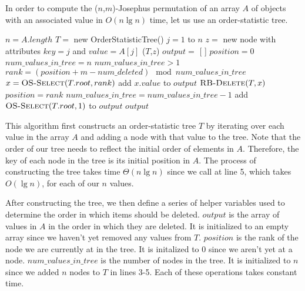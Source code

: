\documentclass[11pt]{article}
\begin{document}
In order to compute the ($n$,$m$)-Josephus permutation of an array $A$ of objects with an associated value in $O(n\lg{n})$ time, let us use an order-statistic tree.

\begin{codebox}
\li $n = A.length$
\li $T = $ new OrderStatisticTree()
\li \For $j=1$ to $n$ \Do
\li     $z = $ new node with attributes $key = j$ and $value = A[j]$
\li     {}($T$,$z$)
\li \End
\li $output =$ [ ]
\li $position = 0$
\li $num\_values\_in\_tree = n$
\li
\li \While $num\_values\_in\_tree > 1$ \Do
\li     $rank = (position + m - num\_deleted) \mod num\_values\_in\_tree$
\li     $x = \textnormal{\scshape OS-Select}(T.root, rank)$
\li     add $x.value$ to $output$
\li     $\textnormal{\scshape RB-Delete}(T,x)$
\li     $position = rank$
\li     $num\_values\_in\_tree = num\_values\_in\_tree - 1$
\li \End
\li add $\textnormal{\scshape OS-Select}(T.root, 1)$ to $output$
\li \Return $output$
\end{codebox}

This algorithm first constructs an order-statistic tree $T$ by iterating over each value in the array $A$ and adding a node with that value to the tree. Note that the order of our tree needs to reflect the initial order of elements in $A$. Therefore, the key of each node in the tree is its initial position in $A$. The process of constructing the tree takes time $\Theta(n\lg{n})$ since we call  at line 5, which takes $O(\lg{n})$, for each of our $n$ values.

After constructing the tree, we then define a series of helper variables used to determine the order in which items should be deleted. $output$ is the array of values in $A$ in the order in which they are deleted. It is initialized to an empty array since we haven't yet removed any values from $T$. $position$ is the rank of the node we are currently at in the tree. It is initalized to 0 since we aren't yet at a node. $num\_values\_in\_tree$ is the number of nodes in the tree. It is initialized to $n$ since we added $n$ nodes to $T$ in lines 3-5. Each of these operations takes constant time.
\end{document}

